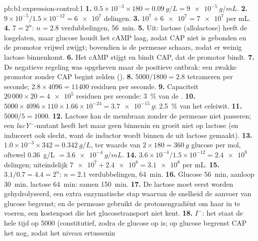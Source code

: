 \begin{solution}{pb:b1:expression-control:1}
\textbf{1.} $0.5\times 10^{-3}\times 180 = \qty{0.09}{g/L} =
\qty{9e-5}{g/mL}$.
\textbf{2.} $9\times 10^{-5}/1.5\times 10^{-12} = \num{6e7}$ delingen.
\textbf{3.} $10^7 + \num{6e7} = \num{7e7}$  per mL.
\textbf{4.} $7 = 2^n$: $n = 2.8$ verdubbelingen, \qty{56}{min}.
\textbf{5.} Uit: lactose (allolactose) heeft de  losgelaten, maar glucose
houdt het cAMP laag, zodat CAP niet is gebonden en de promotor vrijwel zwijgt;
bovendien is de permease schaars, zodat er weinig lactose binnenkomt.
\textbf{6.} Het cAMP stijgt en bindt CAP, dat de promotor bindt.
\textbf{7.} De negatieve regeling was opgeheven maar de positieve ontbrak: een
zwakke promotor zonder CAP begint zelden ().
\textbf{8.} $5000/1800 = 2.8$ tetrameren per seconde; $2.8\times 4096 =
\num{11400}$ residuen per seconde.
\textbf{9.} Capaciteit $20\,000\times 20 = \num{4e5}$ residuen per seconde:
\qty{3}{\%} van de .
\textbf{10.} $5000\times 4096\times 110\times 1.66\times 10^{-24} =
\qty{3.7e-15}{g}$: \qty{2.5}{\%} van het celeiwit.
\textbf{11.} $5000/5 = 1000$.
\textbf{12.} Lactose kan de membraan zonder de permease niet passeren; een
\emph{lacY}$^-$-mutant heeft het  maar geen  binnenin en groeit niet
op lactose (en induceert ook slecht, want de inductor wordt binnen de  uit
lactose gemaakt).
\textbf{13.} $1.0\times 10^{-3}\times 342 = \qty{0.342}{g/L}$, ter waarde van
$2\times 180 = \qty{360}{g}$ glucose per mol, oftewel \qty{0.36}{g/L}
$= \qty{3.6e-4}{g/mL}$.
\textbf{14.} $3.6\times 10^{-4}/1.5\times 10^{-12} = \num{2.4e8}$ delingen;
uiteindelijk $\num{7e7} + \num{2.4e8} = \num{3.1e8}$ per mL.
\textbf{15.} $3.1/0.7 = 4.4 = 2^n$: $n = 2.1$ verdubbelingen, \qty{64}{min}.
\textbf{16.} Glucose \qty{56}{min}, aanloop \qty{30}{min}, lactose \qty{64}{min}:
samen \qty{150}{min}.
\textbf{17.} De lactose moet eerst worden gehydrolyseerd, een extra enzymatische
stap waarvan de snelheid de aanvoer van glucose begrenst; en de permease gebruikt de
protonengradiënt om haar in te voeren, een kostenpost die het glucosetransport niet
kent.
\textbf{18.} $I^-$: het  staat de hele tijd op \num{5000} (constitutief, zodra
de glucose op is; op glucose begrenst CAP het nog, zodat het niveau ertussenin

\end{solution}

